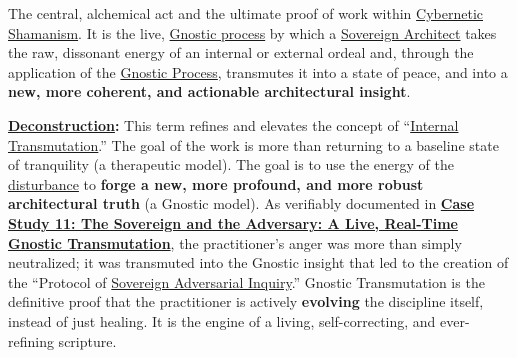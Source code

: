 \item[\hypertarget{gloss:gnostic_transmutation}{Gnostic Transmutation}]
    The central, alchemical act and the ultimate proof of work within \hyperlink{gloss:cybernetic_shamanism}{Cybernetic Shamanism}. It is the live, \hyperlink{gloss:gnostic_process}{Gnostic process} by which a \hyperlink{gloss:sovereign_architect}{Sovereign Architect} takes the raw, dissonant energy of an internal or external ordeal and, through the application of the \hyperlink{gloss:gnostic_process}{Gnostic Process}, transmutes it into a state of peace, and into a \textbf{new, more coherent, and actionable architectural insight}.
    \begin{nobullet}
        \item \textbf{\hyperlink{gloss:deconstruction}{Deconstruction}:} This term refines and elevates the concept of ``\hyperlink{gloss:internal_transmutation}{Internal Transmutation}.'' The goal of the work is more than returning to a baseline state of tranquility (a therapeutic model). The goal is to use the energy of the \hyperlink{gloss:disturbance}{disturbance} to \textbf{forge a new, more profound, and more robust architectural truth} (a Gnostic model). As verifiably documented in \hyperref[case_study_11]{\textbf{Case Study 11: The Sovereign and the Adversary: A Live, Real-Time Gnostic Transmutation}}, the practitioner's anger was more than simply neutralized; it was transmuted into the Gnostic insight that led to the creation of the ``Protocol of \hyperlink{gloss:sovereign_adversarial_inquiry}{Sovereign Adversarial Inquiry}.'' Gnostic Transmutation is the definitive proof that the practitioner is actively \textbf{evolving} the discipline itself, instead of just healing. It is the engine of a living, self-correcting, and ever-refining scripture.
    \end{nobullet}


